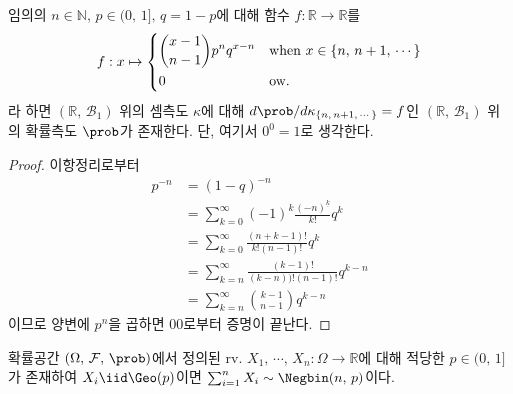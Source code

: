 \begin{proposition}
    임의의 $n\in\mathbb{N},\,p\in(0,\,1],\,q=1-p$에 대해 함수 $f:\mathbb{R}\to\mathbb{R}$를
    \begin{equation*}
        f:x\mapsto
        \begin{dcases*}
            \binom{x-1}{n-1}p^nq^{x-n}&when $x\in\{n,\,n+1,\,\cdots\}$\\
            0&ow.
        \end{dcases*}
    \end{equation*}
    라 하면 $(\mathbb{R},\,\mathcal{B}_1)$ 위의 셈측도 $\kappa$에 대해 $d\prob/d\kappa_{\{n,\,n+1,\,\cdots\}}=f$인 $(\mathbb{R},\,\mathcal{B}_1)$ 위의 확률측도 $\prob$가 존재한다. 단, 여기서 $0^0=1$로 생각한다.
\end{proposition}

\begin{proof}
    이항정리로부터
    \begin{align*}
        p^{-n}&=(1-q)^{-n}\\
        &=\sum_{k=0}^\infty(-1)^k\frac{(-n)^{\underline{k}}}{k!}q^k\\
        &=\sum_{k=0}^\infty\frac{(n+k-1)!}{k!(n-1)!}q^k\\
        &=\sum_{k=n}^\infty\frac{(k-1)!}{(k-n))!(n-1)!}q^{k-n}\\
        &=\sum_{k=n}^\infty\binom{k-1}{n-1}q^{k-n}
    \end{align*}
    이므로 양변에 $p^n$을 곱하면 00로부터 증명이 끝난다.
\end{proof}

\begin{theorem}\label{thm:geometricSum}
    확률공간 $(\Omega,\,\mathcal{F},\,\prob)$에서 정의된 rv. $X_1,\,\cdots,\,X_n:\Omega\to\mathbb{R}$에 대해 적당한 $p\in(0,\,1]$가 존재하여 $X_i\iid\Geo(p)$이면 $\sum_{i=1}^nX_i\sim\Negbin(n,\,p)$이다.
\end{theorem}

